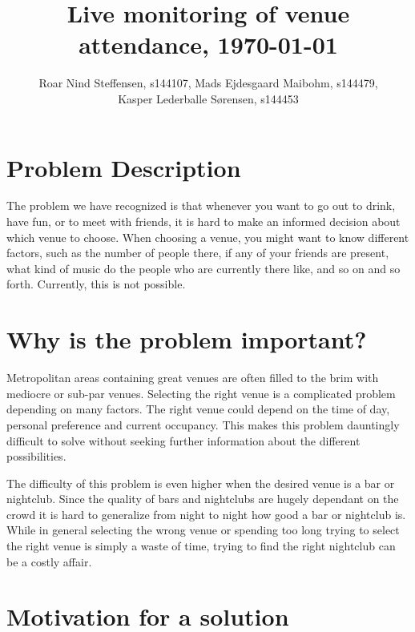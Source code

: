 \documentclass{article}
\title{Live monitoring of venue attendance, \today}
\author{Roar Nind Steffensen, s144107, Mads Ejdesgaard Maibohm, s144479,\\
Kasper Lederballe Sørensen, s144453}
\date{}
\begin{document}
\maketitle

\section*{Problem Description}

The problem we have recognized is that whenever you want to go out to drink, have fun, or to meet with friends, it is hard to make an informed decision about which venue to choose. When choosing a venue, you might want to know different factors, such as the number of people there, if any of your friends are present, what kind of music do the people who are currently there like, and so on and so forth. Currently, this is not possible.

\section*{Why is the problem important?}



Metropolitan areas containing great venues are often filled to the brim with mediocre or sub-par venues. Selecting the right venue is a complicated problem depending on many factors. The right venue could depend on the time of day, personal preference and current occupancy. This makes this problem dauntingly difficult to solve without seeking further information about the different possibilities.

The difficulty of this problem is even higher when the desired venue is a bar or nightclub. Since the quality of bars and nightclubs are hugely dependant on the crowd it is hard to generalize from night to night how good a bar or nightclub is. While in general selecting the wrong venue or spending too long trying to select the right venue is simply a waste of time, trying to find the right nightclub can be a costly affair.
\section*{Motivation for a solution}
\end{document}
